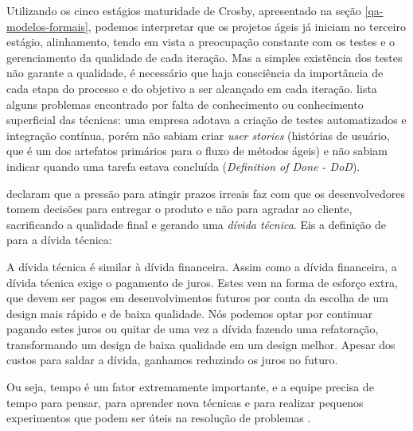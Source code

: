 \documentclass[
	12pt,				%
	openright,			%
	oneside,			%
	a4paper,			%
	english,			%
	brazil,				%
	]{abntex2}
\begin{document}
Utilizando os cinco estágios maturidade de Crosby, apresentado na seção \autoref{qa-modelos-formais}, podemos interpretar que os projetos ágeis já iniciam no terceiro estágio, alinhamento, tendo em vista a preocupação constante com os testes e o gerenciamento da qualidade de cada iteração. Mas a simples existência dos testes não garante a qualidade, é necessário que haja consciência da importância de cada etapa do processo e do objetivo a ser alcançado em cada iteração.  lista alguns problemas encontrado por falta de conhecimento ou conhecimento superficial das técnicas: uma empresa adotava a criação de testes automatizados e integração contínua, porém não sabiam criar \emph{user stories} (histórias de usuário, que é um dos artefatos primários para o fluxo de métodos ágeis) e não sabiam indicar quando uma tarefa estava concluída (\emph{Definition of Done - DoD}). %

 declaram que a pressão para atingir prazos irreais faz com que os desenvolvedores tomem decisões para entregar o produto e não para agradar ao cliente, sacrificando a qualidade final e gerando uma \emph{dívida técnica}. Eis a definição de  para a dívida técnica:

\begin{citacao}
A dívida técnica é similar à dívida financeira. Assim como a dívida financeira, a dívida técnica exige o pagamento de juros. Estes vem na forma de esforço extra, que devem ser pagos em desenvolvimentos futuros por conta da escolha de um design mais rápido e de baixa qualidade. Nós podemos optar por continuar pagando estes juros ou quitar de uma vez a dívida fazendo uma refatoração, transformando um design de baixa qualidade em um design melhor. Apesar dos custos para saldar a dívida, ganhamos reduzindo os juros no futuro.
\end{citacao}


Ou seja, tempo é um fator extremamente importante, e a equipe precisa de tempo para pensar, para aprender nova técnicas e para realizar pequenos experimentos que podem ser úteis na resolução de problemas \cite{crispin2014}.
\end{document}
